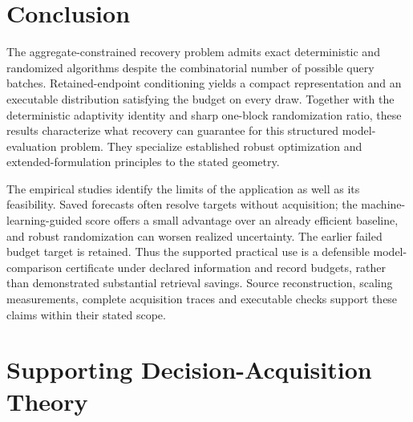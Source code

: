 \documentclass[12pt]{article}
\begin{document}
\FloatBarrier
\section{Conclusion}
The aggregate-constrained recovery problem admits exact deterministic and
randomized algorithms despite the combinatorial number of possible query
batches. Retained-endpoint conditioning yields a compact representation and
an executable distribution satisfying the budget on every draw. Together
with the deterministic adaptivity identity and sharp one-block randomization
ratio, these results characterize what recovery can guarantee for this
structured model-evaluation problem. They specialize established robust
optimization and extended-formulation principles to the stated geometry.

The empirical studies identify the limits of the application as well as
its feasibility. Saved forecasts often resolve targets without acquisition;
the machine-learning-guided score offers a small advantage over an already
efficient baseline, and robust randomization can worsen realized uncertainty.
The earlier failed budget target is retained. Thus the supported practical
use is a defensible model-comparison certificate under declared information
and record budgets, rather than demonstrated substantial retrieval savings.
Source reconstruction, scaling measurements, complete acquisition traces
and executable checks support these claims within their stated scope.

\FloatBarrier
\appendix
\section{Supporting Decision-Acquisition Theory}\label{app:supporting-decision-theory}
\end{document}
